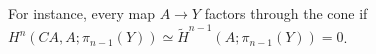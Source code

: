 For instance, every map $A\to Y$ factors through the cone if $H^n(CA,A;\pi_{n-1}(Y)) \simeq \widetilde{H}^{n-1}(A;\pi_{n-1}(Y)) = 0$.
